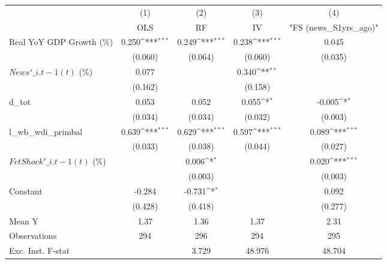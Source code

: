 {
\def\sym#1{\ifmmode^{#1}\else\(^{#1}\)\fi}
\begin{tabular}{l*{4}{c}}
\toprule
                    &\multicolumn{1}{c}{(1)}&\multicolumn{1}{c}{(2)}&\multicolumn{1}{c}{(3)}&\multicolumn{1}{c}{(4)}\\
                    &\multicolumn{1}{c}{OLS}&\multicolumn{1}{c}{RF}&\multicolumn{1}{c}{IV}&\multicolumn{1}{c}{ "FS (news\_S1yrs\_ago)" }\\
\midrule
Real YoY GDP Growth (\%)&       0.250\sym{***}&       0.249\sym{***}&       0.238\sym{***}&       0.045         \\
                    &     (0.060)         &     (0.064)         &     (0.060)         &     (0.035)         \\
\addlinespace
$ News^s\_{i.t-1}(t)$ (\%)&       0.077         &                     &       0.340\sym{**} &                     \\
                    &     (0.162)         &                     &     (0.158)         &                     \\
\addlinespace
d\_tot               &       0.053         &       0.052         &       0.055\sym{*}  &      -0.005\sym{*}  \\
                    &     (0.034)         &     (0.034)         &     (0.032)         &     (0.003)         \\
\addlinespace
l\_wb\_wdi\_primbal    &       0.639\sym{***}&       0.629\sym{***}&       0.597\sym{***}&       0.089\sym{***}\\
                    &     (0.033)         &     (0.038)         &     (0.044)         &     (0.027)         \\
\addlinespace
$ FctShock^s\_{i.t-1}(t)$ (\%)&                     &       0.006\sym{*}  &                     &       0.020\sym{***}\\
                    &                     &     (0.003)         &                     &     (0.003)         \\
\addlinespace
Constant            &      -0.284         &      -0.731\sym{*}  &                     &       0.092         \\
                    &     (0.428)         &     (0.418)         &                     &     (0.277)         \\
\midrule
Mean Y              &        1.37         &        1.36         &        1.37         &        2.31         \\
Observations        &         294         &         296         &         294         &         295         \\
Exc. Inst. F-stat   &                     &       3.729         &      48.976         &      48.704         \\
\bottomrule
\end{tabular}
}
